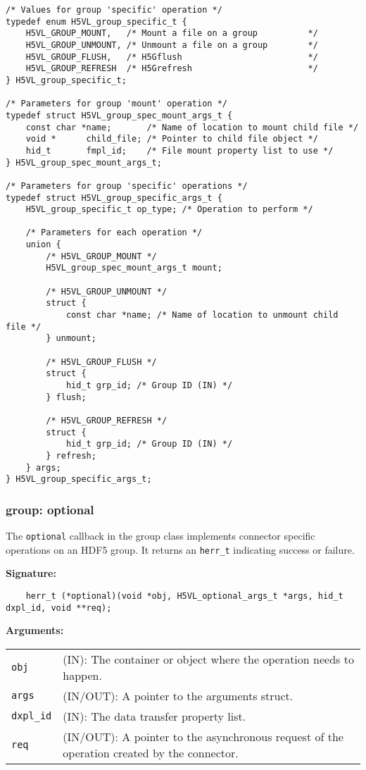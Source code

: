 \begin{lstlisting}
/* Values for group 'specific' operation */
typedef enum H5VL_group_specific_t {
    H5VL_GROUP_MOUNT,   /* Mount a file on a group          */
    H5VL_GROUP_UNMOUNT, /* Unmount a file on a group        */
    H5VL_GROUP_FLUSH,   /* H5Gflush                         */
    H5VL_GROUP_REFRESH  /* H5Grefresh                       */
} H5VL_group_specific_t;

/* Parameters for group 'mount' operation */
typedef struct H5VL_group_spec_mount_args_t {
    const char *name;       /* Name of location to mount child file */
    void *      child_file; /* Pointer to child file object */
    hid_t       fmpl_id;    /* File mount property list to use */
} H5VL_group_spec_mount_args_t;

/* Parameters for group 'specific' operations */
typedef struct H5VL_group_specific_args_t {
    H5VL_group_specific_t op_type; /* Operation to perform */

    /* Parameters for each operation */
    union {
        /* H5VL_GROUP_MOUNT */
        H5VL_group_spec_mount_args_t mount;

        /* H5VL_GROUP_UNMOUNT */
        struct {
            const char *name; /* Name of location to unmount child file */
        } unmount;

        /* H5VL_GROUP_FLUSH */
        struct {
            hid_t grp_id; /* Group ID (IN) */
        } flush;

        /* H5VL_GROUP_REFRESH */
        struct {
            hid_t grp_id; /* Group ID (IN) */
        } refresh;
    } args;
} H5VL_group_specific_args_t;

\end{lstlisting}

\subsubsection{group: optional}
The \texttt{optional} callback in the group class implements connector specific operations on an HDF5 group. It returns an \texttt{herr\_t} indicating success or failure. \bigskip

\begin{mdframed}[style=bgbox]
\textbf{Signature:}
\begin{lstlisting}
    herr_t (*optional)(void *obj, H5VL_optional_args_t *args, hid_t dxpl_id, void **req);
\end{lstlisting}

\textbf{Arguments:}\\
\begin{tabular}{l p{13.5cm}}
  \texttt{obj} & (IN): The container or object where the operation needs to happen.\\
  \texttt{args} & (IN/OUT): A pointer to the arguments struct.\\
  \texttt{dxpl\_id} & (IN): The data transfer property list.\\
  \texttt{req} & (IN/OUT): A pointer to the asynchronous request of the operation created by the connector.\\
\end{tabular}
\end{mdframed}

